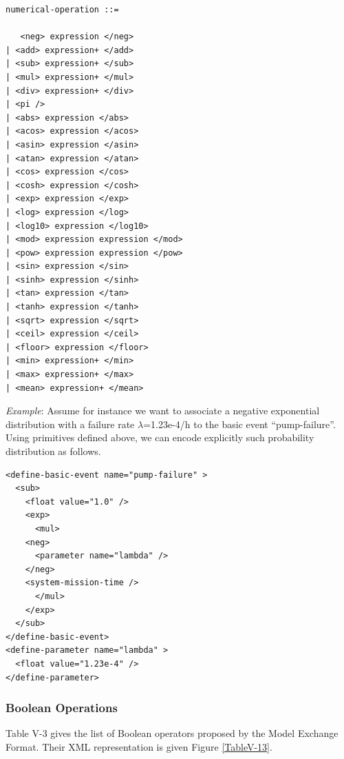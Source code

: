 \documentclass[11pt]{article}
\begin{document}
\lstset{language=[LaTeX]TeX,label= ,caption= ,captionpos=b,numbers=none}
\begin{lstlisting}
numerical-operation ::=

   <neg> expression </neg>
| <add> expression+ </add>
| <sub> expression+ </sub>
| <mul> expression+ </mul>
| <div> expression+ </div>
| <pi />
| <abs> expression </abs>
| <acos> expression </acos>
| <asin> expression </asin>
| <atan> expression </atan>
| <cos> expression </cos>
| <cosh> expression </cosh>
| <exp> expression </exp>
| <log> expression </log>
| <log10> expression </log10>
| <mod> expression expression </mod>
| <pow> expression expression </pow>
| <sin> expression </sin>
| <sinh> expression </sinh>
| <tan> expression </tan>
| <tanh> expression </tanh>
| <sqrt> expression </sqrt>
| <ceil> expression </ceil>
| <floor> expression </floor>
| <min> expression+ </min>
| <max> expression+ </max>
| <mean> expression+ </mean>
\end{lstlisting}

\emph{Example}: Assume for instance we want to associate a negative
exponential distribution with a failure rate \(\lambda\)=1.23e-4/h to the basic
event ``pump-failure''. Using primitives defined above, we can encode
explicitly such probability distribution as follows.


\lstset{language=XML,label= ,caption= ,captionpos=b,numbers=none}
\begin{lstlisting}
<define-basic-event name="pump-failure" >
  <sub>
    <float value="1.0" />
    <exp>
      <mul>
	<neg>
	  <parameter name="lambda" />
	</neg>
	<system-mission-time />
      </mul>
    </exp>
  </sub>
</define-basic-event>
<define-parameter name="lambda" >
  <float value="1.23e-4" />
</define-parameter>
\end{lstlisting}


\subsubsection{Boolean Operations}
\label{sec:orgf31a61a}


Table V-3 gives the list of Boolean operators proposed by the Model
Exchange Format. Their XML representation is given Figure \ref{TableV-13}.
\end{document}
